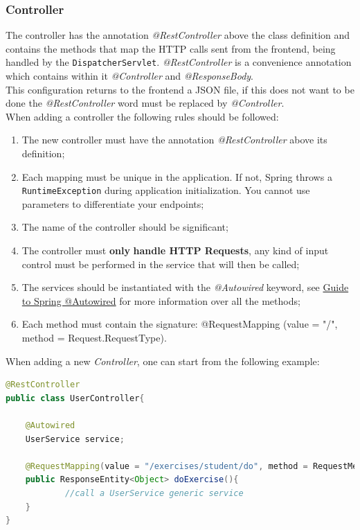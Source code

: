 \subsubsection{Controller}
The controller has the annotation \textit{@RestController} above the class definition and contains the methods that map the HTTP calls sent from the frontend, being handled by the \texttt{DispatcherServlet}. \textit{@RestController} is a convenience annotation which contains within it \textit{@Controller} and \textit{@ResponseBody}.\\
This configuration returns to the frontend a JSON file, if this does not want to be done the \textit{@RestController} word must be replaced by \textit{@Controller}.\\
When adding a controller the following rules should be followed:
\begin{enumerate}
\item The new controller must have the annotation \textit{@RestController} above its definition;
\item Each mapping must be unique in the application. If not, Spring throws a \texttt{RuntimeException} during application initialization. You cannot use parameters to differentiate your endpoints;
\item The name of the controller should be significant;
\item The controller must \textbf{only} \textbf{handle HTTP Requests}, any kind of input control must be performed in the service that will then be called;
\item The services should be instantiated with the \textit{@Autowired} keyword, see \href{https://www.baeldung.com/spring-autowire}{Guide to Spring @Autowired} for more information over all the methods;
\item Each method must contain the signature: @RequestMapping (value = "/", method = Request.RequestType).
\end{enumerate}
When adding a new \textit{Controller}, one can start from the following example:
\begin{lstlisting}[language=Java]
@RestController
public class UserController{

	@Autowired
	UserService service; 
	
	@RequestMapping(value = "/exercises/student/do", method = RequestMethod.POST, produces = MediaType.APPLICATION_JSON_VALUE)
	public ResponseEntity<Object> doExercise(){
			//call a UserService generic service
	}
}
\end{lstlisting}
